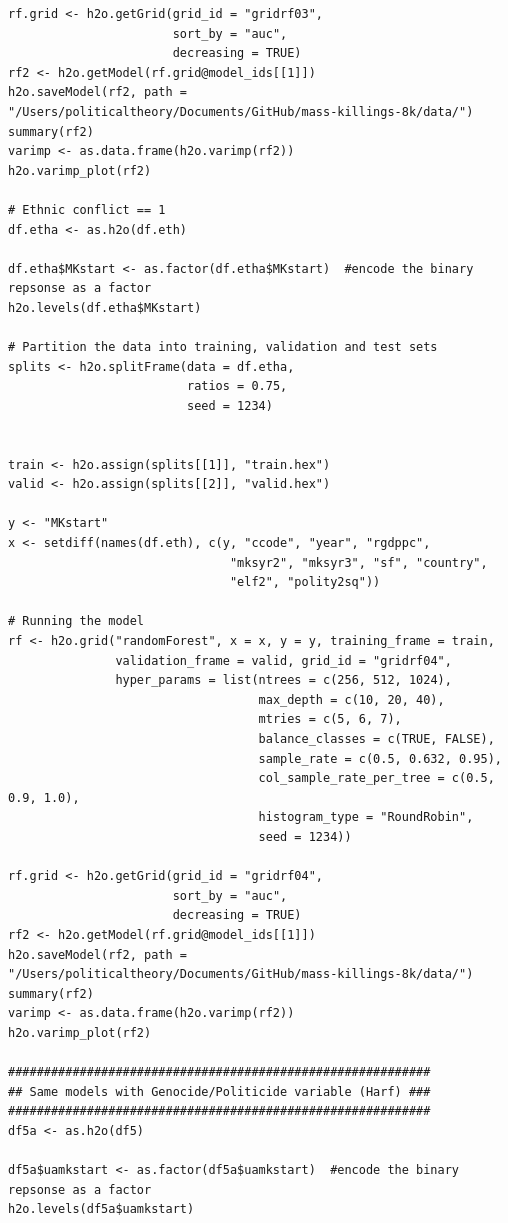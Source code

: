 \documentclass[a4paper,12pt]{article}
\begin{document}
\begin{verbatim}
rf.grid <- h2o.getGrid(grid_id = "gridrf03",
                       sort_by = "auc",
                       decreasing = TRUE)
rf2 <- h2o.getModel(rf.grid@model_ids[[1]])
h2o.saveModel(rf2, path = "/Users/politicaltheory/Documents/GitHub/mass-killings-8k/data/")
summary(rf2)
varimp <- as.data.frame(h2o.varimp(rf2))
h2o.varimp_plot(rf2)

# Ethnic conflict == 1
df.etha <- as.h2o(df.eth)

df.etha$MKstart <- as.factor(df.etha$MKstart)  #encode the binary repsonse as a factor
h2o.levels(df.etha$MKstart)

# Partition the data into training, validation and test sets
splits <- h2o.splitFrame(data = df.etha, 
                         ratios = 0.75,  
                         seed = 1234)  


train <- h2o.assign(splits[[1]], "train.hex")   
valid <- h2o.assign(splits[[2]], "valid.hex") 

y <- "MKstart"
x <- setdiff(names(df.eth), c(y, "ccode", "year", "rgdppc",
                               "mksyr2", "mksyr3", "sf", "country",
                               "elf2", "polity2sq")) 

# Running the model
rf <- h2o.grid("randomForest", x = x, y = y, training_frame = train, 
               validation_frame = valid, grid_id = "gridrf04",
               hyper_params = list(ntrees = c(256, 512, 1024),
                                   max_depth = c(10, 20, 40),
                                   mtries = c(5, 6, 7),
                                   balance_classes = c(TRUE, FALSE),
                                   sample_rate = c(0.5, 0.632, 0.95),
                                   col_sample_rate_per_tree = c(0.5, 0.9, 1.0),
                                   histogram_type = "RoundRobin",
                                   seed = 1234)) 

rf.grid <- h2o.getGrid(grid_id = "gridrf04",
                       sort_by = "auc",
                       decreasing = TRUE)
rf2 <- h2o.getModel(rf.grid@model_ids[[1]])
h2o.saveModel(rf2, path = "/Users/politicaltheory/Documents/GitHub/mass-killings-8k/data/")
summary(rf2)
varimp <- as.data.frame(h2o.varimp(rf2))
h2o.varimp_plot(rf2)

###########################################################
## Same models with Genocide/Politicide variable (Harf) ###
###########################################################
df5a <- as.h2o(df5)

df5a$uamkstart <- as.factor(df5a$uamkstart)  #encode the binary repsonse as a factor
h2o.levels(df5a$uamkstart)


\end{verbatim}
\end{document}
